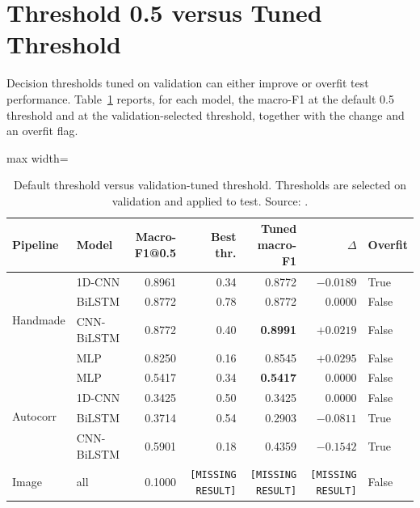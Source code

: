 \section{Threshold 0.5 versus Tuned Threshold}
\label{sec:threshold}

Decision thresholds tuned on validation can either improve or overfit test
performance. Table~\ref{tab:threshold} reports, for each model, the macro-F1 at
the default 0.5 threshold and at the validation-selected threshold, together
with the change and an overfit flag.

\begin{table}[htbp]
\centering
\caption[Default threshold versus validation-tuned threshold.]{Default threshold versus validation-tuned threshold. Thresholds are selected on validation and applied to test. Source: \protect{}.}
\label{tab:threshold}
\tablefont
\begin{adjustbox}{max width=\textwidth}
\begin{tabular}{llrrrrl}
\toprule
Pipeline & Model & Macro-F1@0.5 & Best thr. & Tuned macro-F1 & $\Delta$ & Overfit \\
\midrule
\multirow{4}{*}{Handmade}
& 1D-CNN & 0.8961 & 0.34 & 0.8772 & $-0.0189$ & True \\
& BiLSTM & 0.8772 & 0.78 & 0.8772 & $0.0000$ & False \\
& CNN-BiLSTM & 0.8772 & 0.40 & \textbf{0.8991} & $+0.0219$ & False \\
& MLP & 0.8250 & 0.16 & 0.8545 & $+0.0295$ & False \\
\midrule
\multirow{4}{*}{Autocorr}
& MLP & 0.5417 & 0.34 & \textbf{0.5417} & $0.0000$ & False \\
& 1D-CNN & 0.3425 & 0.50 & 0.3425 & $0.0000$ & False \\
& BiLSTM & 0.3714 & 0.54 & 0.2903 & $-0.0811$ & True \\
& CNN-BiLSTM & 0.5901 & 0.18 & 0.4359 & $-0.1542$ & True \\
\midrule
Image & all & 0.1000 & \texttt{[MISSING RESULT]} & \texttt{[MISSING RESULT]} & \texttt{[MISSING RESULT]} & False \\
\bottomrule
\end{tabular}
\end{adjustbox}
\end{table}

